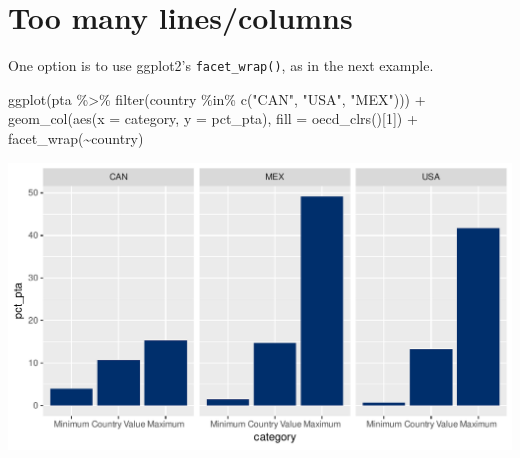 \documentclass[
  11pt,
  oneside]{report}
\newenvironment{Shaded}{\begin{snugshade}}{\end{snugshade}}
\newcommand{\AttributeTok}[1]{\textcolor[rgb]{0.77,0.63,0.00}{#1}}
\newcommand{\DecValTok}[1]{\textcolor[rgb]{0.00,0.00,0.81}{#1}}
\newcommand{\FunctionTok}[1]{\textcolor[rgb]{0.00,0.00,0.00}{#1}}
\newcommand{\NormalTok}[1]{#1}
\newcommand{\SpecialCharTok}[1]{\textcolor[rgb]{0.00,0.00,0.00}{#1}}
\newcommand{\StringTok}[1]{\textcolor[rgb]{0.31,0.60,0.02}{#1}}
\begin{document}
\hypertarget{too-many-linescolumns}{%
\section{Too many lines/columns}\label{too-many-linescolumns}}

One option is to use ggplot2's \texttt{facet\_wrap()}, as in the next
example.

\begin{Shaded}
\begin{Highlighting}[]
\FunctionTok{ggplot}\NormalTok{(pta }\SpecialCharTok{\%\textgreater{}\%} \FunctionTok{filter}\NormalTok{(country }\SpecialCharTok{\%in\%} \FunctionTok{c}\NormalTok{(}\StringTok{"CAN"}\NormalTok{, }\StringTok{"USA"}\NormalTok{, }\StringTok{"MEX"}\NormalTok{))) }\SpecialCharTok{+}
  \FunctionTok{geom\_col}\NormalTok{(}\FunctionTok{aes}\NormalTok{(}\AttributeTok{x =}\NormalTok{ category, }\AttributeTok{y =}\NormalTok{ pct\_pta), }\AttributeTok{fill =} \FunctionTok{oecd\_clrs}\NormalTok{()[}\DecValTok{1}\NormalTok{]) }\SpecialCharTok{+}
  \FunctionTok{facet\_wrap}\NormalTok{(}\SpecialCharTok{\textasciitilde{}}\NormalTok{country)}
\end{Highlighting}
\end{Shaded}

\begin{center}\includegraphics{book_figures/unnamed-chunk-6-1} \end{center}

\newpage

\thispagestyle{empty}
\pagecolor{mypurple}\afterpage{\nopagecolor}

\null
\vfill
\end{document}
